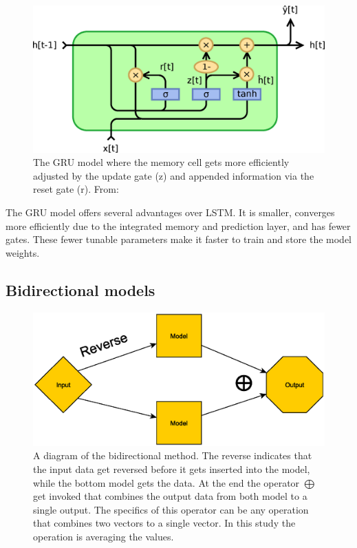 \begin{figure}[H]
	\centering
	\includegraphics[width = \textwidth]{figures/Gated_Recurrent_Unit_type_2.eps}
	\caption[GRU model sketch]{The GRU model where the memory cell gets more efficiently adjusted by the update gate (z) and appended information via the reset gate (r). From: \cite{jeblad_english_2018}}
\end{figure}

The GRU model offers several advantages over LSTM. It is smaller, converges more efficiently due to the integrated memory and prediction layer, and has fewer gates. These fewer tunable parameters make it faster to train and store the model weights.

\subsection{Bidirectional models}

\begin{figure}
	\centering
	\includegraphics[width=0.8\linewidth]{figures/Bimodel}
	\caption[Bi-directional model diargam]{A diagram of the bidirectional method. The reverse indicates that the input data get reversed before it gets inserted into the model, while the bottom model gets the data. At the end the operator $\bigoplus$ get invoked that combines the output data from both model to a single output. The specifics of this operator can be any operation that combines two vectors to a single vector. In this study the operation is averaging the values.}
	\label{fig:bimodel}
\end{figure}

